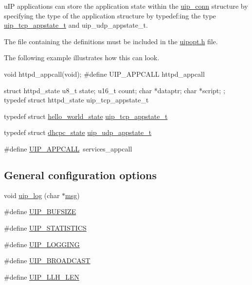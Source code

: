 uIP applications can store the application state within the \hyperlink{structuip__conn}{uip\_\-conn} structure by specifying the type of the application structure by typedef:ing the type \hyperlink{unionuip__tcp__appstate__t}{uip\_\-tcp\_\-appstate\_\-t} and uip\_\-udp\_\-appstate\_\-t.

The file containing the definitions must be included in the \hyperlink{uipopt_8h}{uipopt.h} file.

The following example illustrates how this can look. 
\begin{DoxyCode}
void httpd_appcall(void);
#define UIP_APPCALL     httpd_appcall

struct httpd_state {
  u8_t state;
  u16_t count;
  char *dataptr;
  char *script;
};
typedef struct httpd_state uip_tcp_appstate_t
\end{DoxyCode}
 \begin{DoxyCompactItemize}
\item 
typedef struct \hyperlink{structhello__world__state}{hello\_\-world\_\-state} \hyperlink{group__uipopt_ga69646a81a922033c5281445a71f8ffed}{uip\_\-tcp\_\-appstate\_\-t}
\item 
typedef struct \hyperlink{structdhcpc__state}{dhcpc\_\-state} \hyperlink{group__uipopt_gaa92afb113e122f860392bfbd385f842e}{uip\_\-udp\_\-appstate\_\-t}
\item 
\#define \hyperlink{group__uipopt_ga41aa744caa46913b3b3aedb2a4e78546}{UIP\_\-APPCALL}~services\_\-appcall
\end{DoxyCompactItemize}
\subsection*{General configuration options}
\label{_amgrpb8c9c9095ad43c7a9416ca5403936eb8}
 \begin{DoxyCompactItemize}
\item 
void \hyperlink{group__uipopt_gab58e1ceb7cb73ca2bcd73146b6c1b4e7}{uip\_\-log} (char $\ast$\hyperlink{client__msg_8c_a2d9fc9fb256865977515b723173ffa09}{msg})
\item 
\#define \hyperlink{group__uipopt_ga3589822ecb9d9c4145209756396b8a6b}{UIP\_\-BUFSIZE}
\item 
\#define \hyperlink{group__uipopt_ga5726142fec34f35fb9ea19e5a45975c6}{UIP\_\-STATISTICS}
\item 
\#define \hyperlink{group__uipopt_ga21664b7441cfa37d280228d23316d609}{UIP\_\-LOGGING}
\item 
\#define \hyperlink{group__uipopt_ga156dd2891a57035e4afdc4c2bc0b0ebf}{UIP\_\-BROADCAST}
\item 
\#define \hyperlink{group__uipopt_gae6f4a2453dbd8bc60e6a82774552366a}{UIP\_\-LLH\_\-LEN}
\end{DoxyCompactItemize}
